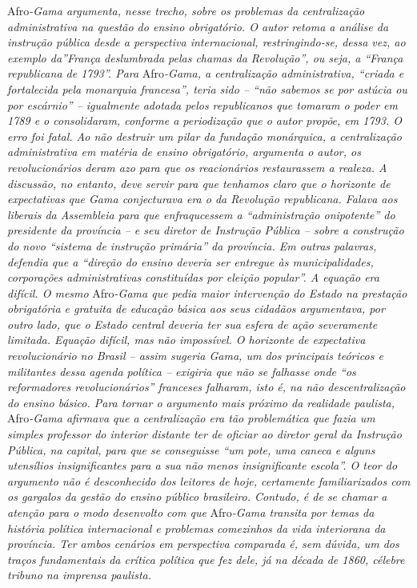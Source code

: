 \begin{didascalia}
Afro\emph{-Gama argumenta, nesse trecho, sobre os problemas da
centralização administrativa na questão do ensino obrigatório. O autor
retoma a análise da instrução pública desde a perspectiva internacional,
restringindo-se, dessa vez, ao exemplo da''França deslumbrada pelas
chamas da Revolução'', ou seja, a ``França republicana de 1793''. Para}
Afro\emph{-Gama, a centralização administrativa, ``criada e fortalecida
pela monarquia francesa'', teria sido -- ``não sabemos se por astúcia ou
por escárnio'' -- igualmente adotada pelos republicanos que tomaram o
poder em 1789 e o consolidaram, conforme a periodização que o autor
propõe, em 1793. O erro foi fatal. Ao não destruir um pilar da fundação
monárquica, a centralização administrativa em matéria de ensino
obrigatório, argumenta o autor, os revolucionários deram azo para que os
reacionários restaurassem a realeza. A discussão, no entanto, deve
servir para que tenhamos claro que o horizonte de expectativas que Gama
conjecturava era o da Revolução republicana. Falava aos liberais da
Assembleia para que enfraqucessem a ``administração onipotente'' do
presidente da província -- e seu diretor de Instrução Pública -- sobre a
construção do novo ``sistema de instrução primária'' da província. Em
outras palavras, defendia que a ``direção do ensino deveria ser
entregue às municipalidades, corporações administrativas constituídas
por eleição popular''. A equação era difícil. O mesmo} Afro\emph{-Gama
que pedia maior intervenção do Estado na prestação obrigatória e
gratuita de educação básica aos seus cidadãos argumentava, por outro
lado, que o Estado central deveria ter sua esfera de ação severamente
limitada. Equação difícil, mas não impossível. O horizonte de
expectativa revolucionário no Brasil -- assim sugeria Gama, um dos
principais teóricos e militantes dessa agenda política -- exigiria que
não se falhasse onde ``os reformadores revolucionários'' franceses
falharam, isto é, na não descentralização do ensino básico. Para tornar
o argumento mais próximo da realidade paulista,} Afro\emph{-Gama
afirmava que a centralização era tão problemática que fazia um simples
professor do interior distante ter de oficiar ao diretor geral da
Instrução Pública, na capital, para que se conseguisse ``um pote, uma
caneca e alguns utensílios insignificantes para a sua não menos
insignificante escola''. O teor do argumento não é desconhecido dos
leitores de hoje, certamente familiarizados com os gargalos da gestão do
ensino público brasileiro. Contudo, é de se chamar a atenção para o modo
desenvolto com que} Afro\emph{-Gama transita por temas da história
política internacional e problemas comezinhos da vida interiorana da
província. Ter ambos cenários em perspectiva comparada é, sem dúvida, um
dos traços fundamentais da crítica política que fez dele, já na década
de 1860, célebre tribuno na imprensa paulista.}
\end{didascalia}



